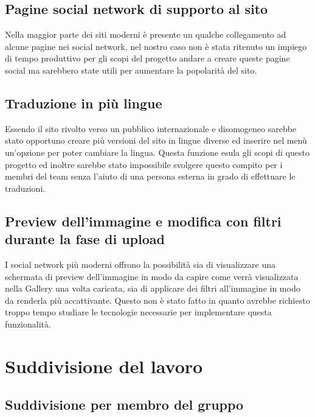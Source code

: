 \documentclass[openany, a4paper, 12pt]{report}
\begin{document}
		\section{Pagine social network di supporto al sito}
		Nella maggior parte dei siti moderni è presente un qualche collegamento ad alcune pagine nei social network, nel nostro caso non è stata ritenuto un impiego di tempo produttivo per gli scopi del progetto andare a creare queste pagine social ma sarebbero state utili per aumentare la popolarità del sito.

		\section{Traduzione in più lingue}
		Essendo il sito rivolto verso un pubblico internazionale e disomogeneo sarebbe stato opportuno creare più versioni del sito in lingue diverse ed inserire nel menù un'opzione per poter cambiare la lingua. Questa funzione esula gli scopi di questo progetto ed inoltre sarebbe stato impossibile svolgere questo compito per i membri del team senza l'aiuto di una persona esterna in grado di effettuare le traduzioni.
		
		\section{Preview dell'immagine e modifica con filtri durante la fase di upload}
		I social network più moderni offrono la possibilità sia di visualizzare una schermata di preview dell'immagine in modo da capire come verrà visualizzata nella Gallery una volta caricata, sia di applicare dei filtri all'immagine in modo da renderla più accattivante. Questo non è stato fatto in quanto avrebbe richiesto troppo tempo studiare le tecnologie necessarie per implementare questa funzionalità.


	\chapter{Suddivisione del lavoro}
	\section{Suddivisione per membro del gruppo}
\end{document}
